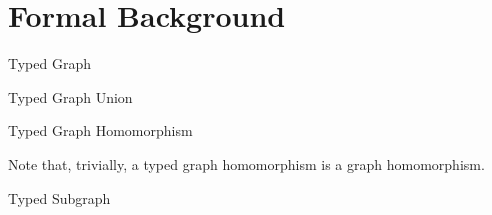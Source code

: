 \section{Formal Background}
\label{sec:appendix_formal_background}

\setcounter{definition}{0}
\setcounter{subsection}{0}
\onehalfspacing 


\begin{definition}{Typed Graph\\}
\label{def:typed_graph_appendix}
\end{definition}



\begin{definition}{Typed Graph Union\\}
\label{def:typed_graph_union_appendix}
\end{definition}




\begin{definition}{Typed Graph Homomorphism\\}
\label{def:typed_graph_homomorphism_appendix}
\end{definition}

Note that, trivially, a typed graph homomorphism is a graph homomorphism.


\begin{definition}{Typed Subgraph\\}
\label{def:typedsubgraph_appendix}
\end{definition}


